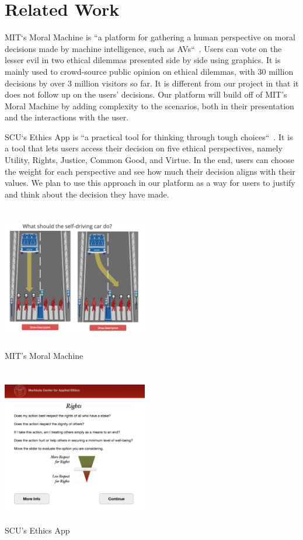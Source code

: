 \documentclass[12pt,journal,compsoc]{IEEEtran}
\begin{document}
\section{Related Work}
MIT`s Moral Machine is ``a platform for gathering a human perspective on moral decisions made by machine intelligence, such as AVs``~\cite{mit}. Users can vote on the lesser evil in two ethical dilemmas presented side by side using graphics. It is mainly used to crowd-source public opinion on ethical dilemmas, with 30 million decisions by over 3 million visitors so far. It is different from our project in that it does not follow up on the users’ decisions. Our platform will build off of MIT’s Moral Machine by adding complexity to the scenarios, both in their presentation and the interactions with the user.

SCU`s Ethics App is ``a practical tool for thinking through tough choices``~\cite{scu}. It is a tool that lets users access their decision on five ethical perspectives, namely Utility, Rights, Justice, Common Good, and Virtue. In the end, users can choose the weight for each perspective and see how much their decision aligns with their values. We plan to use this approach in our platform as a way for users to justify and think about the decision they have made.


\newpage

\appendices

\section{}
\vspace{0.5cm}
\includegraphics[width=2.5in]{images/proposal-mit.png}
\\\\ MIT's Moral Machine

\section{}
\vspace{0.5cm}
\includegraphics[width=2.5in]{images/proposal-scu.png}
\\\\ SCU's Ethics App
\end{document}

